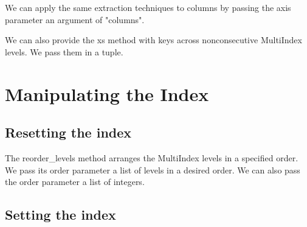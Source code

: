 We can apply the same extraction techniques to columns by passing the axis parameter an argument of "columns".

We can also provide the xs method with keys across nonconsecutive MultiIndex levels. We pass them in a tuple.
\section{Manipulating the Index}
\subsection{Resetting the index}
The reorder\_levels method arranges the MultiIndex levels in a specified order. We pass its order parameter a list of levels in a desired order. We can also pass the order parameter a list of integers.

\subsection{Setting the index}